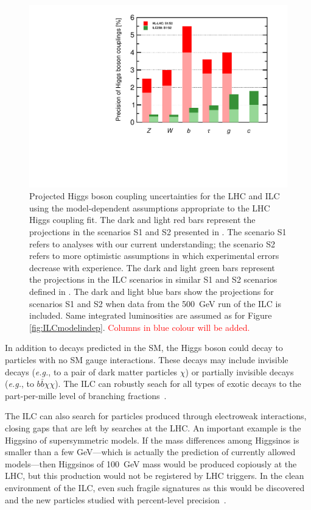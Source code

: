 \documentclass[%
 reprint,
 amsmath,amssymb,
 aps,
]{revtex4-1}
\newcommand{\todo}[1]{\textcolor{red}{{#1}}}
\def\eg{{\it e.g.}}
\begin{document}
\begin{figure}
\begin{center}
\includegraphics[width=0.70\hsize]{figures/ModeldepSummary.pdf}
\caption{Projected Higgs boson coupling uncertainties for the LHC and
  ILC
using the model-dependent assumptions appropriate to the LHC Higgs
coupling fit.   The
dark and light red bars represent the projections in the scenarios S1
and S2 presented in  \cite{Yellow}.  The scenario S1 refers to
analyses with our current understanding; the scenario S2 refers to
more optimistic assumptions in which experimental errors decrease with
experience.  The dark and light green bars represent the
projections in the ILC scenarios in similar S1 and S2 scenarios defined in
\cite{ILCforESS}. 
 The dark and light blue bars show the projections for scenarios S1 and S2
when
data from the 500~GeV run of the ILC is included. Same integrated luminosities are assumed as for Figure \ref{fig:ILCmodelindep}. \todo{Columns in blue colour will be added.}}
 \label{fig:ILCLHC}
\end{center}
\end{figure}

In addition to decays predicted in the SM, the Higgs boson could decay
to particles with no SM gauge interactions.    These decays may
include invisible decays (\eg, to a pair of dark matter particles $\chi$)  or
partially invisible decays (\eg, to $b\bar b \chi \chi$).   The ILC
can robustly seach for all types of exotic decays  to the 
part-per-mille level of branching fractions~\cite{Liu:2016zki}.

The ILC can also search for particles produced through electroweak
interactions, closing gaps that are left by searches at the LHC.  An
important example is the Higgsino of supersymmetric models.   If the
mass  differences among Higgsinos is smaller than a few GeV---which is
actually the prediction of currently allowed models---then Higgsinos
of 100~GeV mass would be produced copiously at the LHC, but this
production would not be registered by LHC triggers.  In the clean
environment 
of the ILC, even such fragile signatures as this 
would be discovered and the new particles 
studied with percent-level precision~\cite{Higgsino}.
\end{document}

